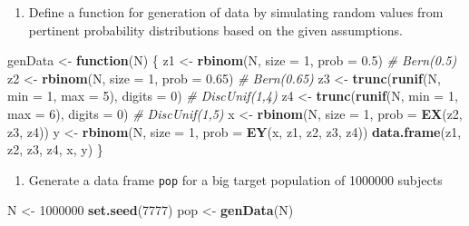\documentclass[
]{book}
\newenvironment{Shaded}{\begin{snugshade}}{\end{snugshade}}
\newcommand{\AttributeTok}[1]{\textcolor[rgb]{0.13,0.29,0.53}{#1}}
\newcommand{\CommentTok}[1]{\textcolor[rgb]{0.56,0.35,0.01}{\textit{#1}}}
\newcommand{\ControlFlowTok}[1]{\textcolor[rgb]{0.13,0.29,0.53}{\textbf{#1}}}
\newcommand{\DecValTok}[1]{\textcolor[rgb]{0.00,0.00,0.81}{#1}}
\newcommand{\FloatTok}[1]{\textcolor[rgb]{0.00,0.00,0.81}{#1}}
\newcommand{\FunctionTok}[1]{\textcolor[rgb]{0.13,0.29,0.53}{\textbf{#1}}}
\newcommand{\NormalTok}[1]{#1}
\newcommand{\OtherTok}[1]{\textcolor[rgb]{0.56,0.35,0.01}{#1}}
\providecommand{\tightlist}{%
  \setlength{\itemsep}{0pt}\setlength{\parskip}{0pt}}
\theoremstyle{definition}
\theoremstyle{definition}
\theoremstyle{definition}
\theoremstyle{definition}
\theoremstyle{remark}
\begin{document}
\begin{enumerate}
\def\labelenumi{\arabic{enumi}.}
\setcounter{enumi}{1}
\tightlist
\item
  Define a function for generation of data by simulating random values
  from pertinent probability distributions based on the given
  assumptions.
\end{enumerate}

\begin{Shaded}
\begin{Highlighting}[]
\NormalTok{genData }\OtherTok{\textless{}{-}} \ControlFlowTok{function}\NormalTok{(N) \{}
\NormalTok{  z1 }\OtherTok{\textless{}{-}} \FunctionTok{rbinom}\NormalTok{(N, }\AttributeTok{size =} \DecValTok{1}\NormalTok{, }\AttributeTok{prob =} \FloatTok{0.5}\NormalTok{) }\CommentTok{\# Bern(0.5)}
\NormalTok{  z2 }\OtherTok{\textless{}{-}} \FunctionTok{rbinom}\NormalTok{(N, }\AttributeTok{size =} \DecValTok{1}\NormalTok{, }\AttributeTok{prob =} \FloatTok{0.65}\NormalTok{) }\CommentTok{\# Bern(0.65)}
\NormalTok{  z3 }\OtherTok{\textless{}{-}} \FunctionTok{trunc}\NormalTok{(}\FunctionTok{runif}\NormalTok{(N, }\AttributeTok{min =} \DecValTok{1}\NormalTok{, }\AttributeTok{max =} \DecValTok{5}\NormalTok{), }\AttributeTok{digits =} \DecValTok{0}\NormalTok{) }\CommentTok{\# DiscUnif(1,4)}
\NormalTok{  z4 }\OtherTok{\textless{}{-}} \FunctionTok{trunc}\NormalTok{(}\FunctionTok{runif}\NormalTok{(N, }\AttributeTok{min =} \DecValTok{1}\NormalTok{, }\AttributeTok{max =} \DecValTok{6}\NormalTok{), }\AttributeTok{digits =} \DecValTok{0}\NormalTok{) }\CommentTok{\# DiscUnif(1,5)}
\NormalTok{  x }\OtherTok{\textless{}{-}} \FunctionTok{rbinom}\NormalTok{(N, }\AttributeTok{size =} \DecValTok{1}\NormalTok{, }\AttributeTok{prob =} \FunctionTok{EX}\NormalTok{(z2, z3, z4))}
\NormalTok{  y }\OtherTok{\textless{}{-}} \FunctionTok{rbinom}\NormalTok{(N, }\AttributeTok{size =} \DecValTok{1}\NormalTok{, }\AttributeTok{prob =} \FunctionTok{EY}\NormalTok{(x, z1, z2, z3, z4))}
  \FunctionTok{data.frame}\NormalTok{(z1, z2, z3, z4, x, y)}
\NormalTok{\}}
\end{Highlighting}
\end{Shaded}

\begin{enumerate}
\def\labelenumi{\arabic{enumi}.}
\setcounter{enumi}{2}
\tightlist
\item
  Generate a data frame \texttt{pop} for a big target population of 1000000
  subjects
\end{enumerate}

\begin{Shaded}
\begin{Highlighting}[]
\NormalTok{N }\OtherTok{\textless{}{-}} \DecValTok{1000000}
\FunctionTok{set.seed}\NormalTok{(}\DecValTok{7777}\NormalTok{)}
\NormalTok{pop }\OtherTok{\textless{}{-}} \FunctionTok{genData}\NormalTok{(N)}
\end{Highlighting}
\end{Shaded}
\end{document}
